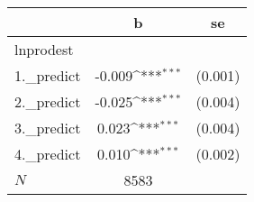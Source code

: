 {
\def\sym#1{\ifmmode^{#1}\else\(^{#1}\)\fi}
\begin{tabular}{l*{1}{cc}}
\hline\hline
            &           b         &          se\\
\hline
lnprodest   &                     &            \\
1.\_predict  &      -0.009\sym{***}&     (0.001)\\
2.\_predict  &      -0.025\sym{***}&     (0.004)\\
3.\_predict  &       0.023\sym{***}&     (0.004)\\
4.\_predict  &       0.010\sym{***}&     (0.002)\\
\hline
\(N\)       &        8583         &            \\
\hline\hline
\end{tabular}
}
